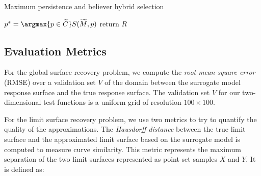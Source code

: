 {\fontsize{10}{10}\selectfont
\begin{algorithm}
\scriptsize
\caption{Maximum persistence and believer hybrid selection}
\label{algo:maxp-believe}
\begin{algorithmic}
    \State $p^* = \argmax{p \in \widetilde{C}} S(\widetilde{M}, p)$
  \EndWhile
\EndWhile
\State return $R$
\EndProcedure
\end{algorithmic}
\end{algorithm}
}

\subsection{Evaluation Metrics}
\label{sec:evaluation_metrics}
%
For the global surface recovery problem, we compute the \emph{root-mean-square error} (RMSE) over a validation set $V$ of the domain between the surrogate model response surface and the true response surface.
%
The validation set $V$ for our two-dimensional test functions is a uniform grid of resolution $100\times100$.

For the limit surface recovery problem, we use two metrics to try to quantify the quality of the approximations.
%
The \emph{Hausdorff distance} between the true limit surface and the approximated limit surface based on the surrogate model is computed to measure curve similarity.
%
This metric represents the maximum separation of the two limit surfaces represented as point set samples $X$ and $Y$. It is defined as:

